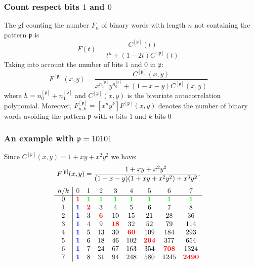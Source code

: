 \documentclass{beamer}
\begin{document}
\begin{frame} \frametitle{Count respect bits $1$ and $0$}
The gf counting the number $F_{n}$ of binary words with 
length $n$ not containing the pattern $\mathfrak{p}$ is
\begin{displaymath}
    F(t) = \frac{C^{[\mathfrak{p}]}(t)}{t^{h} + (1-2t)C^{[\mathfrak{p}]}(t)}
\end{displaymath}
Taking into account the number of bits $1$ and $0$ in $\mathfrak{p}$:
\begin{displaymath}
    F^{[\mathfrak{p}]}(x, y) = \frac{C^{[\mathfrak{p}]}(x,y)}{x^{n_{1}^{[\mathfrak{p}]}} y^{n_{0}^{[\mathfrak{p}]}}
        + (1-x-y)C^{[\mathfrak{p}]}(x, y)}
\end{displaymath}
where $h = {n_{0}^{[\mathfrak{p}]}}+{n_{1}^{[\mathfrak{p}]}}$ and $C^{[\mathfrak{p}]}(x, y)$
is the bivariate autocorrelation polynomial. Moreover, 
$F_{n, k}^{[\mathfrak{p}]} =[x^n y^k]F^{[\mathfrak{p}]}(x,y)$ denotes the number of binary 
words avoiding the pattern $\mathfrak{p}$ with $n$ bits $1$ and $k$ bits $0$
\end{frame}

\begin{frame}\frametitle{An example with $\mathfrak{p}= 10101$}
Since $C^{[\mathfrak{p}]}(x,y)=1+xy+x^2y^2$ we have:
$$F^{[\mathfrak{p}]}(x,y)={1+xy+x^2y^2 \over (1-x-y)(1+xy+x^2y^2)+x^3y^2}. $$
$$
\begin{array}{c|cccccccc}
n/k  & 0 & 1 & 2 & 3 & 4 &5 &6 &7  \\ \cline{1-9} 0 & {\bf\color{red} 1} & {\bf\color{green} 1} & {\bf\color{green}1} & {\bf\color{green}1}&
{\bf\color{green}1}
&  {\bf\color{green}1} & {\bf\color{green}1} & {\bf\color{green}1}\\
1 & {\bf\color{blue} 1} & {\bf\color{red}2} & 3 & 4 & 5 & 6 & 7 & 8 \\
2 & {\bf\color{blue} 1} & 3 & {\bf\color{red}6} & 10 & 15 & 21 & 28 & 36\\
3 & {\bf\color{blue} 1} & 4 & 9 & {\bf\color{red}18} & 32 & 52& 79 & 114\\
4 & {\bf\color{blue} 1} & 5 & 13 & 30 & {\bf\color{red}60} & 109& 184 & 293\\
5 & {\bf\color{blue} 1} & 6 & 18 & 46 & 102 & {\bf\color{red}204} & 377 & 654\\
6 & {\bf\color{blue} 1} & 7 & 24 & 67 & 163 & 354& {\bf\color{red}708} & 1324\\
7 & {\bf\color{blue} 1} & 8 & 31 & 94 & 248 &580& 1245 &{\bf\color{red}2490}
\end{array}
$$
\end{frame}
\end{document}
